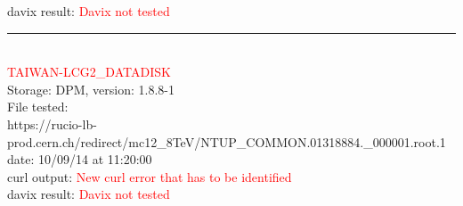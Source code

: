 davix result:  \textcolor{red}{Davix not tested}\\

\rule{\textwidth}{1pt}\\

\textcolor{red}{\normalsize{TAIWAN-LCG2\_DATADISK}}\\

Storage: DPM, version: 1.8.8-1\\

File tested:\\
\footnotesize{https://rucio-lb-prod.cern.ch/redirect/mc12\_8TeV/NTUP\_COMMON.01318884.\_000001.root.1}\\

date: 10/09/14 at 11:20:00\\

curl output:  \textcolor{red}{New curl error that has to be identified}\\

davix result:  \textcolor{red}{Davix not tested}\\

